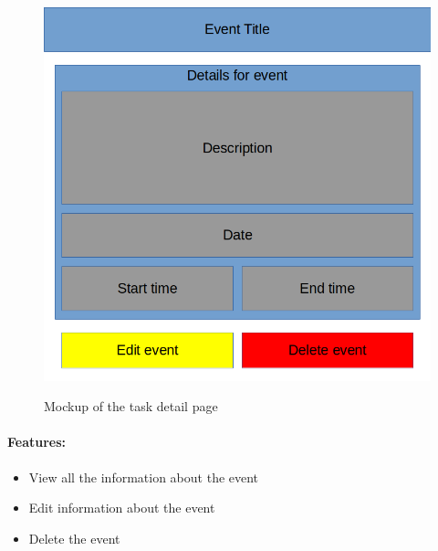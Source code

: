 \documentclass{article}
\begin{document}
\begin{minipage}{0.5\textwidth}
	\begin{figure}[H]
		\includegraphics[width=\linewidth]{Mockups/event_detail.png}
		\label{fig:event_detail_mockup}
		\caption{Mockup of the task detail page}
	\end{figure}
\end{minipage} \hfill
\begin{minipage}{0.45\textwidth}
	\paragraph{Features:}
	\begin{samepage}
		\begin{itemize}
			\item View all the information about the event
			\item Edit information about the event
			\item Delete the event
		\end{itemize}
	\end{samepage}
\end{minipage}
\end{document}
